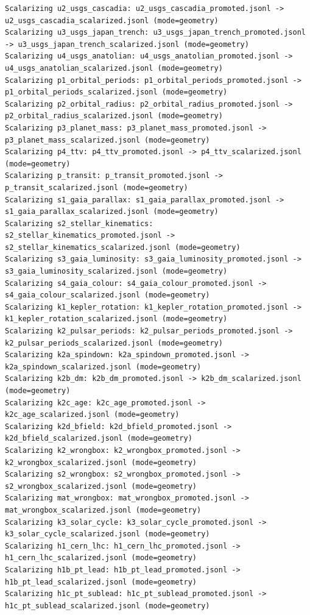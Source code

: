 \documentclass[11pt, letterpaper, openany]{book}
\begin{document}
\begin{empiricalbox}
\begin{lstlisting}[style=terminal]
Scalarizing u2_usgs_cascadia: u2_usgs_cascadia_promoted.jsonl -> u2_usgs_cascadia_scalarized.jsonl (mode=geometry)
Scalarizing u3_usgs_japan_trench: u3_usgs_japan_trench_promoted.jsonl -> u3_usgs_japan_trench_scalarized.jsonl (mode=geometry)
Scalarizing u4_usgs_anatolian: u4_usgs_anatolian_promoted.jsonl -> u4_usgs_anatolian_scalarized.jsonl (mode=geometry)
Scalarizing p1_orbital_periods: p1_orbital_periods_promoted.jsonl -> p1_orbital_periods_scalarized.jsonl (mode=geometry)
Scalarizing p2_orbital_radius: p2_orbital_radius_promoted.jsonl -> p2_orbital_radius_scalarized.jsonl (mode=geometry)
Scalarizing p3_planet_mass: p3_planet_mass_promoted.jsonl -> p3_planet_mass_scalarized.jsonl (mode=geometry)
Scalarizing p4_ttv: p4_ttv_promoted.jsonl -> p4_ttv_scalarized.jsonl (mode=geometry)
Scalarizing p_transit: p_transit_promoted.jsonl -> p_transit_scalarized.jsonl (mode=geometry)
Scalarizing s1_gaia_parallax: s1_gaia_parallax_promoted.jsonl -> s1_gaia_parallax_scalarized.jsonl (mode=geometry)
Scalarizing s2_stellar_kinematics: s2_stellar_kinematics_promoted.jsonl -> s2_stellar_kinematics_scalarized.jsonl (mode=geometry)
Scalarizing s3_gaia_luminosity: s3_gaia_luminosity_promoted.jsonl -> s3_gaia_luminosity_scalarized.jsonl (mode=geometry)
Scalarizing s4_gaia_colour: s4_gaia_colour_promoted.jsonl -> s4_gaia_colour_scalarized.jsonl (mode=geometry)
Scalarizing k1_kepler_rotation: k1_kepler_rotation_promoted.jsonl -> k1_kepler_rotation_scalarized.jsonl (mode=geometry)
Scalarizing k2_pulsar_periods: k2_pulsar_periods_promoted.jsonl -> k2_pulsar_periods_scalarized.jsonl (mode=geometry)
Scalarizing k2a_spindown: k2a_spindown_promoted.jsonl -> k2a_spindown_scalarized.jsonl (mode=geometry)
Scalarizing k2b_dm: k2b_dm_promoted.jsonl -> k2b_dm_scalarized.jsonl (mode=geometry)
Scalarizing k2c_age: k2c_age_promoted.jsonl -> k2c_age_scalarized.jsonl (mode=geometry)
Scalarizing k2d_bfield: k2d_bfield_promoted.jsonl -> k2d_bfield_scalarized.jsonl (mode=geometry)
Scalarizing k2_wrongbox: k2_wrongbox_promoted.jsonl -> k2_wrongbox_scalarized.jsonl (mode=geometry)
Scalarizing s2_wrongbox: s2_wrongbox_promoted.jsonl -> s2_wrongbox_scalarized.jsonl (mode=geometry)
Scalarizing mat_wrongbox: mat_wrongbox_promoted.jsonl -> mat_wrongbox_scalarized.jsonl (mode=geometry)
Scalarizing k3_solar_cycle: k3_solar_cycle_promoted.jsonl -> k3_solar_cycle_scalarized.jsonl (mode=geometry)
Scalarizing h1_cern_lhc: h1_cern_lhc_promoted.jsonl -> h1_cern_lhc_scalarized.jsonl (mode=geometry)
Scalarizing h1b_pt_lead: h1b_pt_lead_promoted.jsonl -> h1b_pt_lead_scalarized.jsonl (mode=geometry)
Scalarizing h1c_pt_sublead: h1c_pt_sublead_promoted.jsonl -> h1c_pt_sublead_scalarized.jsonl (mode=geometry)

\end{lstlisting}
\end{empiricalbox}
\end{document}
